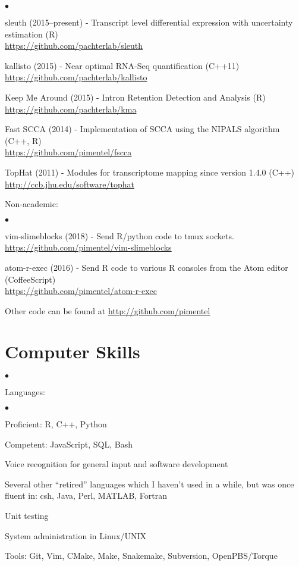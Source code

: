 \documentclass[11pt,notitlepage]{article} %
\newenvironment{list2}{
  \vspace{-\parskip}
  \begin{list}{$\bullet$}{%
      \setlength{\itemsep}{0in}
      \setlength{\parsep}{0in} \setlength{\parskip}{0in}
      \setlength{\topsep}{0in} \setlength{\partopsep}{0in}
      \setlength{\leftmargin}{0.2in}}}{\end{list}}
\begin{document}
\begin{list2}
  \item sleuth (2015--present) - Transcript level differential expression with uncertainty estimation (R)\\
    \url{https://github.com/pachterlab/sleuth}
  \item kallisto (2015) - Near optimal RNA-Seq quantification (C++11)\\
    \url{https://github.com/pachterlab/kallisto}
  \item Keep Me Around (2015) - Intron Retention Detection and Analysis (R) \\
    \url{https://github.com/pachterlab/kma}
  \item Fast SCCA (2014) - Implementation of SCCA using the NIPALS algorithm (C++, R) \\
    \url{https://github.com/pimentel/fscca}
  \item TopHat (2011) - Modules for transcriptome mapping since version 1.4.0 (C++) \\
    \url{http://ccb.jhu.edu/software/tophat}
\end{list2}

\bigskip
Non-academic:

\begin{list2}
\item vim-slimeblocks (2018) - Send R/python code to tmux sockets.\\
  \url{https://github.com/pimentel/vim-slimeblocks}
\item atom-r-exec (2016) - Send R code to various R consoles from the Atom editor (CoffeeScript)\\
  \url{https://github.com/pimentel/atom-r-exec}
  \item Other code can be found at \url{http://github.com/pimentel}

\end{list2}

\bigskip
\section*{Computer Skills}
\begin{list2}
\item Languages:
  \begin{list2}
    \item Proficient: R, C++, Python
    \item Competent: JavaScript, SQL, Bash
  \end{list2}
\item Voice recognition for general input and software development
\item Several other ``retired'' languages which I haven't used in a while,
  but was once fluent in: csh, Java, Perl, MATLAB, Fortran
\item Unit testing
\item System administration in Linux/UNIX
\item Tools: Git, Vim, CMake, Make, Snakemake, Subversion, OpenPBS/Torque\\
\end{list2}
\end{document}
